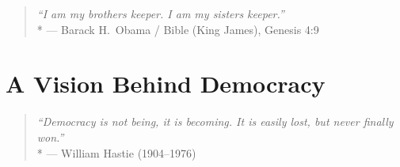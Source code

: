 







\begin{quote}
	\emph{``I am my brothers keeper. I am my sisters keeper.''}
	\\*
	--- Barack H.\ Obama / Bible (King James), Genesis 4:9
\end{quote}

\section{A Vision Behind Democracy}

\begin{quote}
	\emph{``Democracy is not being, it is becoming.
	It is easily lost, but never finally won.''}
	\\*
	--- William Hastie (1904--1976)
\end{quote}

